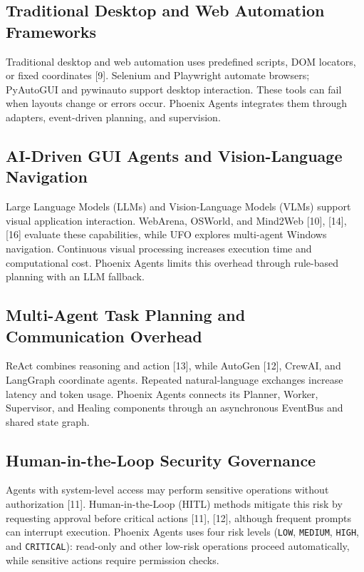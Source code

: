 \documentclass[conference]{IEEEtran}
\begin{document}
\subsection{Traditional Desktop and Web Automation Frameworks}

Traditional desktop and web automation uses predefined scripts, DOM locators, or fixed coordinates [9]. Selenium and Playwright automate browsers; PyAutoGUI and pywinauto support desktop interaction. These tools can fail when layouts change or errors occur. Phoenix Agents integrates them through adapters, event-driven planning, and supervision.

\subsection{AI-Driven GUI Agents and Vision-Language Navigation}

Large Language Models (LLMs) and Vision-Language Models (VLMs) support visual application interaction. WebArena, OSWorld, and Mind2Web [10], [14], [16] evaluate these capabilities, while UFO explores multi-agent Windows navigation. Continuous visual processing increases execution time and computational cost. Phoenix Agents limits this overhead through rule-based planning with an LLM fallback.

\subsection{Multi-Agent Task Planning and Communication Overhead}

ReAct combines reasoning and action [13], while AutoGen [12], CrewAI, and LangGraph coordinate agents. Repeated natural-language exchanges increase latency and token usage. Phoenix Agents connects its Planner, Worker, Supervisor, and Healing components through an asynchronous EventBus and shared state graph.

\subsection{Human-in-the-Loop Security Governance}

Agents with system-level access may perform sensitive operations without authorization [11]. Human-in-the-Loop (HITL) methods mitigate this risk by requesting approval before critical actions [11], [12], although frequent prompts can interrupt execution. Phoenix Agents uses four risk levels (\texttt{LOW}, \texttt{MEDIUM}, \texttt{HIGH}, and \texttt{CRITICAL}): read-only and other low-risk operations proceed automatically, while sensitive actions require permission checks.
\end{document}
